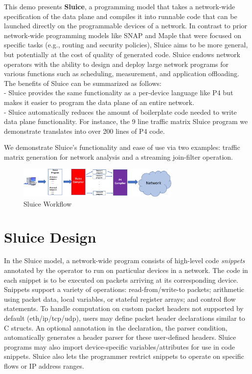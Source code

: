 This demo presents \textbf{Sluice}, a programming model that takes a
network-wide specification of the data plane and compiles it into runnable code
that can be launched directly on the programmable devices of a network. In
contrast to prior network-wide programming models like SNAP and Maple that were
focused on specific tasks (e.g., routing and security policies), Sluice aims to
be more general, but potentially at the cost of quality of generated code.
Sluice endows network operators with the ability to design and deploy large
network programs for various functions such as scheduling, measurement, and
application offloading.  The benefits of Sluice can be summarized as follows:\\
\indent - Sluice provides the same functionality as a per-device language like
P4 but makes it easier to program the data plane of an entire network. \\
\indent - Sluice automatically reduces the amount of boilerplate code needed to
write data plane functionality. For instance, the 9 line traffic matrix Sluice
program we demonstrate translates into over 200 lines of P4 code.

We demonstrate Sluice's functionality and ease of use
via two examples: traffic matrix generation for network analysis and a
streaming join-filter operation.
\begin{figure}[tp]
\centering
\includegraphics[width=80mm,scale=0.7]{figures/sluice_workflow.pdf}
\caption{Sluice Workflow}
\vspace{-8mm}
\end{figure}
\vspace{-4mm}

\section{Sluice Design}
In the Sluice model, a network-wide program consists of high-level code
\textit{snippets} annotated by the operator to run on particular devices in a
network. The code in each snippet is to be executed on packets arriving at its
corresponding device. Snippets support a variety of operations:
read-from/write-to packets; arithmetic using packet data, local variables, or
stateful register arrays; and control flow statements. To handle computation on
custom packet headers not supported by default (eth/ip/tcp/udp), users may
define packet header declarations similar to C structs. An optional annotation
in the declaration, the parser condition, automatically generates a header
parser for these user-defined headers. Sluice programs may also import
device-specific variables/attributes for use in code snippets. Sluice also lets
the programmer restrict snippets to operate on specific flows or IP address
ranges.

